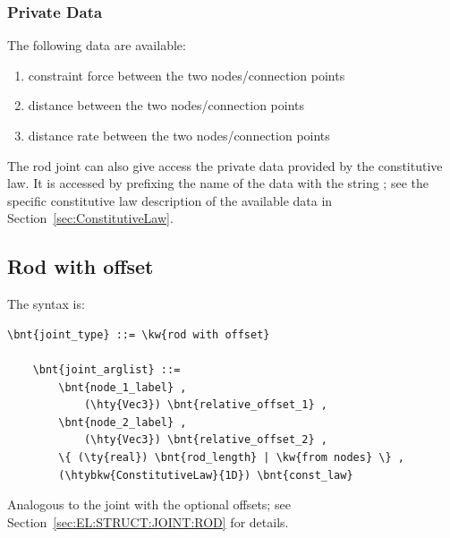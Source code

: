 \subsubsection{Private Data}
The following data are available:
\begin{enumerate}
\item {} constraint force between the two nodes/connection points
\item {} distance between the two nodes/connection points
\item {} distance rate between the two nodes/connection points
\end{enumerate}
The rod joint can also give access the private data provided 
by the constitutive law.
It is accessed by prefixing the name of the data with the string
; see the specific constitutive law
description of the available data in Section~\ref{sec:ConstitutiveLaw}.





\subsection{Rod with offset}
\label{sec:EL:STRUCT:JOINT:ROD_WITH_OFFSET}
The syntax is:
\begin{Verbatim}[commandchars=\\\{\}]
    \bnt{joint_type} ::= \kw{rod with offset}

    \bnt{joint_arglist} ::=
        \bnt{node_1_label} ,
            (\hty{Vec3}) \bnt{relative_offset_1} ,
        \bnt{node_2_label} ,
            (\hty{Vec3}) \bnt{relative_offset_2} ,
        \{ (\ty{real}) \bnt{rod_length} | \kw{from nodes} \} ,
        (\htybkw{ConstitutiveLaw}{1D}) \bnt{const_law}
\end{Verbatim}
Analogous to the  joint with the optional offsets;
see Section~\ref{sec:EL:STRUCT:JOINT:ROD} for details.


